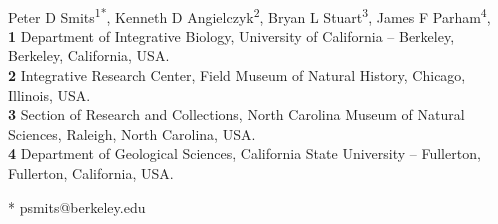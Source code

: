 \documentclass[10pt,letterpaper]{article}
\date{}
\begin{document}
\vspace*{0.2in}

\begin{flushleft}
  {\Large
  \textbf{} %
  }
  \newline
  \\
  Peter D Smits\textsuperscript{1*},
  Kenneth D Angielczyk\textsuperscript{2},
  Bryan L Stuart\textsuperscript{3},
  James F Parham\textsuperscript{4},
  \\
  \bigskip
  \textbf{1} Department of Integrative Biology, University of California -- Berkeley, Berkeley, California, USA.
  \\
  \textbf{2} Integrative Research Center, Field Museum of Natural History, Chicago, Illinois, USA.
  \\
  \textbf{3} Section of Research and Collections, North Carolina Museum of Natural Sciences, Raleigh, North Carolina, USA.
  \\
  \textbf{4} Department of Geological Sciences, California State University -- Fullerton, Fullerton, California, USA.
  \\
  \bigskip






  * psmits@berkeley.edu

\end{flushleft}
\end{document}
